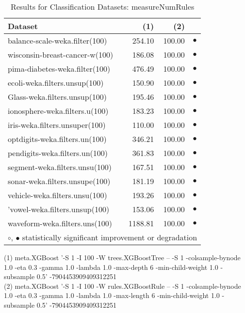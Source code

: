 \documentclass{article}
\begin{document}
\begin{table}[H]
\caption{\label{labelname}Results for Classification Datasets: measureNumRules}
\footnotesize
{\centering \begin{tabular}{lrr@{\hspace{0.1cm}}c}
\\
\hline
Dataset & (1)& (2) & \\
\hline
balance-scale-weka.filter(100) &  254.10 &  100.00 &        $\bullet$\\
wisconsin-breast-cancer-w(100) &  186.08 &  100.00 &         $\bullet$\\
pima-diabetes-weka.filter(100) &  476.49 &  100.00 &         $\bullet$\\
ecoli-weka.filters.unsup(100) &  150.90 &   100.00 &        $\bullet$ \\
Glass-weka.filters.unsup(100) &  195.46 &  100.00 &         $\bullet$\\
ionosphere-weka.filters.u(100) &  183.23 &  100.00 &        $\bullet$ \\
iris-weka.filters.unsuper(100) & 110.00 & 100.00 &        $\bullet$ \\
optdigits-weka.filters.un(100) &  346.21 &  100.00 &        $\bullet$ \\
pendigits-weka.filters.un(100) &  361.83 &  100.00 &        $\bullet$ \\
segment-weka.filters.unsu(100) &  167.51 &  100.00 &         $\bullet$\\
sonar-weka.filters.unsupe(100) &  181.19 &  100.00 &         $\bullet$\\
vehicle-weka.filters.unsu(100) &  193.26 &  100.00 &         $\bullet$\\
'vowel-weka.filters.unsup(100) &  153.06 &  100.00 &         $\bullet$\\
waveform-weka.filters.uns(100) &  1188.81 &  100.00 &         $\bullet$\\
\hline
\multicolumn{4}{c}{$\circ$, $\bullet$ statistically significant improvement or degradation}\\
\end{tabular} \footnotesize \par}
\end{table}

\begin{table}[H]

\scriptsize
{
(1) meta.XGBoost '-S 1 -I 100 -W trees.XGBoostTree -- -S 1 -colsample-bynode 1.0 -eta 0.3 -gamma 1.0 -lambda 1.0 -max-depth 6 -min-child-weight 1.0 -subsample 0.5' -7904453909409312251 \\
(2) meta.XGBoost '-S 1 -I 100 -W rules.XGBoostRule -- -S 1 -colsample-bynode 1.0 -eta 0.3 -gamma 1.0 -lambda 1.0 -max-length 6 -min-child-weight 1.0 -subsample 0.5' -7904453909409312251 \\
}

\end{table}
\end{document}
